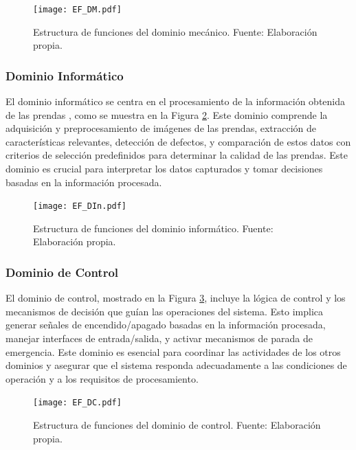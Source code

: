 \begin{figure}[H]
	\centering
	\texttt{[image: EF\_DM.pdf]}
	\caption[Estructura de funciones del dominio mecánico.]{Estructura de funciones del dominio mecánico. Fuente: Elaboración propia.}
	\label{fig:EF_DM}
\end{figure}

\subsubsection{Dominio Informático}

El dominio informático se centra en el procesamiento de la información obtenida de las prendas , como se muestra en la Figura \ref{fig:EF_DIn}. Este dominio comprende la adquisición y preprocesamiento de imágenes de las prendas, extracción de características relevantes, detección de defectos, y comparación de estos datos con criterios de selección predefinidos para determinar la calidad de las prendas. Este dominio es crucial para interpretar los datos capturados y tomar decisiones basadas en la información procesada.

\begin{figure}[H]
	\centering
	\texttt{[image: EF\_DIn.pdf]}
	\caption[Estructura de funciones del dominio informático.]{Estructura de funciones del dominio informático. Fuente: Elaboración propia.}
	\label{fig:EF_DIn}
\end{figure}

\subsubsection{Dominio de Control}

El dominio de control, mostrado en la Figura \ref{fig:EF_DC}, incluye la lógica de control y los mecanismos de decisión que guían las operaciones del sistema. Esto implica generar señales de encendido/apagado basadas en la información procesada, manejar interfaces de entrada/salida, y activar mecanismos de parada de emergencia. Este dominio es esencial para coordinar las actividades de los otros dominios y asegurar que el sistema responda adecuadamente a las condiciones de operación y a los requisitos de procesamiento.

\begin{figure}[H]
	\centering
	\texttt{[image: EF\_DC.pdf]}
	\caption[Estructura de funciones del dominio de control.]{Estructura de funciones del dominio de control. Fuente: Elaboración propia.}
	\label{fig:EF_DC}
\end{figure}

